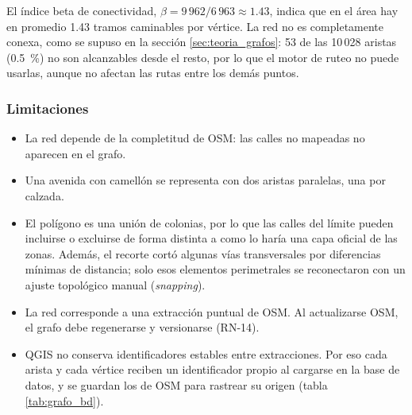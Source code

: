 El índice beta de conectividad, $\beta = 9\,962 / 6\,963 \approx 1.43$, indica que en el área hay en promedio 1.43 tramos caminables por vértice. La red no es completamente conexa, como se supuso en la sección \ref{sec:teoria_grafos}: 53 de las 10\,028 aristas (0.5~\%) no son alcanzables desde el resto, por lo que el motor de ruteo no puede usarlas, aunque no afectan las rutas entre los demás puntos.

\subsubsection{Limitaciones}

\begin{itemize}
    \item La red depende de la completitud de OSM: las calles no mapeadas no aparecen en el grafo.
    \item Una avenida con camellón se representa con dos aristas paralelas, una por calzada.
    \item El polígono es una unión de colonias, por lo que las calles del límite pueden incluirse o excluirse de forma distinta a como lo haría una capa oficial de las zonas. Además, el recorte cortó algunas vías transversales por diferencias mínimas de distancia; solo esos elementos perimetrales se reconectaron con un ajuste topológico manual (\textit{snapping}).
    \item La red corresponde a una extracción puntual de OSM. Al actualizarse OSM, el grafo debe regenerarse y versionarse (RN-14).
    \item QGIS no conserva identificadores estables entre extracciones. Por eso cada arista y cada vértice reciben un identificador propio al cargarse en la base de datos, y se guardan los de OSM para rastrear su origen (tabla \ref{tab:grafo_bd}).
\end{itemize}
